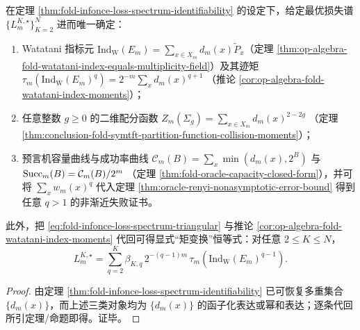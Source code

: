 \begin{corollary}\label{cor:fold-infonce-loss-spectrum-determines-index-tqft-capacity}
在定理 \ref{thm:fold-infonce-loss-spectrum-identifiability} 的设定下，给定最优损失谱 \(\{L_m^{K,\star}\}_{K=2}^{N}\) 进而唯一确定：
\begin{enumerate}
\normalfont
  \item Watatani 指标元 \(\mathrm{Ind}_{\mathrm W}(E_m)=\sum_{x\in X_m}d_m(x)\widetilde P_x\)（定理 \ref{thm:op-algebra-fold-watatani-index-equals-multiplicity-field}）及其迹矩
  \(
  \tau_m(\mathrm{Ind}_{\mathrm W}(E_m)^q)=2^{-m}\sum_x d_m(x)^{q+1}
  \)
  （推论 \ref{cor:op-algebra-fold-watatani-index-moments}）；
  \item 任意整数 \(g\ge 0\) 的二维配分函数
  \(
  Z_m(\Sigma_g)=\sum_{x\in X_m}d_m(x)^{2-2g}
  \)
  （定理 \ref{thm:conclusion-fold-symtft-partition-function-collision-moments}）；
  \item 预言机容量曲线与成功率曲线
  \(
  \mathcal{C}_m(B)=\sum_x \min(d_m(x),2^B)
  \)
  与 \({\rm Succ}_m(B)=\mathcal{C}_m(B)/2^m\)
  （定理 \ref{thm:fold-oracle-capacity-closed-form}），并可将 \(\sum_x w_m(x)^q\) 代入定理 \ref{thm:oracle-renyi-nonasymptotic-error-bound} 得到任意 \(q>1\) 的非渐近失败证书。
\end{enumerate}
\par
此外，把 \eqref{eq:fold-infonce-loss-spectrum-triangular} 与推论 \ref{cor:op-algebra-fold-watatani-index-moments} 代回可得显式“矩变换”恒等式：对任意 \(2\le K\le N\)，
\[
L_m^{K,\star}
=\sum_{q=2}^{K}\beta_{K,q}\,2^{-(q-1)m}\,\tau_m\!\left(\mathrm{Ind}_{\mathrm W}(E_m)^{q-1}\right).
\]
\end{corollary}
\begin{proof}
由定理 \ref{thm:fold-infonce-loss-spectrum-identifiability} 已可恢复多重集合 \(\{d_m(x)\}\)，而上述三类对象均为 \(\{d_m(x)\}\) 的函子化表达或幂和表达；逐条代回所引定理/命题即得。证毕。
\end{proof}

